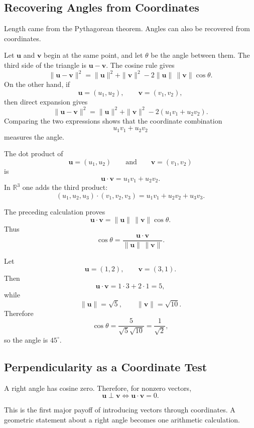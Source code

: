 \subsection{Recovering Angles from Coordinates}

Length came from the Pythagorean theorem.  Angles can also be recovered from
coordinates.

Let $\mathbf u$ and $\mathbf v$ begin at the same point, and let $\theta$ be the
angle between them.  The third side of the triangle is $\mathbf u-\mathbf v$.
The cosine rule gives
\[
\|\mathbf u-\mathbf v\|^2
=
\|\mathbf u\|^2+\|\mathbf v\|^2
-2\|\mathbf u\|\,\|\mathbf v\|\cos\theta.
\]
On the other hand, if
\[
\mathbf u=(u_1,u_2),
\qquad
\mathbf v=(v_1,v_2),
\]
then direct expansion gives
\[
\|\mathbf u-\mathbf v\|^2
=
\|\mathbf u\|^2+\|\mathbf v\|^2
-2(u_1v_1+u_2v_2).
\]
Comparing the two expressions shows that the coordinate combination
\[
u_1v_1+u_2v_2
\]
measures the angle.

\begin{definitionbox}
The dot product of
\[
\mathbf u=(u_1,u_2)
\qquad\text{and}\qquad
\mathbf v=(v_1,v_2)
\]
is
\[
\mathbf u\cdot\mathbf v=u_1v_1+u_2v_2.
\]
In $\mathbb R^3$ one adds the third product:
\[
(u_1,u_2,u_3)\cdot(v_1,v_2,v_3)
=
u_1v_1+u_2v_2+u_3v_3.
\]
\end{definitionbox}

The preceding calculation proves
\[
\mathbf u\cdot\mathbf v
=
\|\mathbf u\|\,\|\mathbf v\|\cos\theta.
\]
Thus
\[
\cos\theta
=
\frac{\mathbf u\cdot\mathbf v}
{\|\mathbf u\|\,\|\mathbf v\|}.
\]

\begin{examplebox}
Let
\[
\mathbf u=(1,2),
\qquad
\mathbf v=(3,1).
\]
Then
\[
\mathbf u\cdot\mathbf v=1\cdot3+2\cdot1=5,
\]
while
\[
\|\mathbf u\|=\sqrt5,
\qquad
\|\mathbf v\|=\sqrt{10}.
\]
Therefore
\[
\cos\theta=
\frac{5}{\sqrt5\sqrt{10}}
=
\frac{1}{\sqrt2},
\]
so the angle is $45^\circ$.
\end{examplebox}

\subsection{Perpendicularity as a Coordinate Test}

A right angle has cosine zero.  Therefore, for nonzero vectors,
\[
\mathbf u\perp\mathbf v
\iff
\mathbf u\cdot\mathbf v=0.
\]

This is the first major payoff of introducing vectors through coordinates.  A
geometric statement about a right angle becomes one arithmetic calculation.

